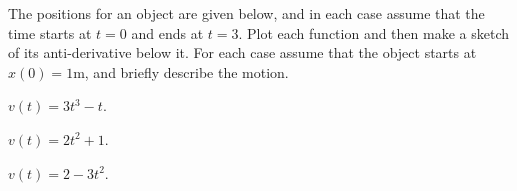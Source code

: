 \begin{problem}
\begin{problem}
\item The positions for an object are given below, and in each case
  assume that the time starts at $t=0$ and ends at $t=3$. Plot each
  function and then make a sketch of its anti-derivative below it.
  For each case assume that the object starts at $x(0)=1$m, and
  briefly describe the motion.

  \begin{subproblem}
    \item $v(t)= 3t^3-t$.
      \vfill
    \item $v(t)=2t^2 + 1$.
      \vfill
    \item $v(t)=2-3t^2$.
      \vfill
  \end{subproblem}

\end{problem}
\end{problem}



